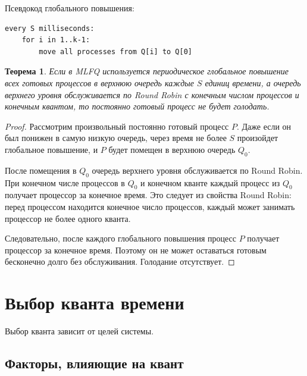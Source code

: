 \documentclass[12pt,a4paper]{article}
\newtheorem{theorem}{Теорема}
\begin{document}
Псевдокод глобального повышения:

\begin{lstlisting}
every S milliseconds:
    for i in 1..k-1:
        move all processes from Q[i] to Q[0]
\end{lstlisting}

\begin{theorem}
Если в MLFQ используется периодическое глобальное повышение всех готовых процессов в верхнюю очередь каждые $S$ единиц времени, а очередь верхнего уровня обслуживается по Round Robin с конечным числом процессов и конечным квантом, то постоянно готовый процесс не будет голодать.
\end{theorem}

\begin{proof}
Рассмотрим произвольный постоянно готовый процесс $P$. Даже если он был понижен в самую низкую очередь, через время не более $S$ произойдет глобальное повышение, и $P$ будет помещен в верхнюю очередь $Q_0$.

После помещения в $Q_0$ очередь верхнего уровня обслуживается по Round Robin. При конечном числе процессов в $Q_0$ и конечном кванте каждый процесс из $Q_0$ получает процессор за конечное время. Это следует из свойства Round Robin: перед процессом находится конечное число процессов, каждый может занимать процессор не более одного кванта.

Следовательно, после каждого глобального повышения процесс $P$ получает процессор за конечное время. Поэтому он не может оставаться готовым бесконечно долго без обслуживания. Голодание отсутствует.
\end{proof}

\section{Выбор кванта времени}

Выбор кванта зависит от целей системы.

\subsection{Факторы, влияющие на квант}
\end{document}
